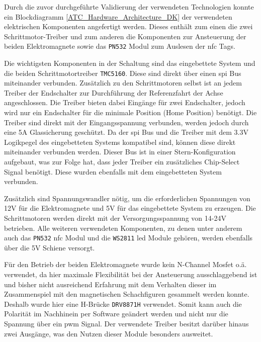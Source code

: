 Durch die zuvor durchgeführte Validierung der verwendeten Technologien
konnte ein Blockdiagramm \ref{ATC_Hardware_Architecture_DK} der
verwendeten elektrischen Komponenten angefertigt werden. Dieses enthält
zum einen die zwei Schrittmotor-Treiber und zum anderen die Komponenten
zur Ansteuerung der beiden Elektromagnete sowie das
\passthrough{\lstinline!PN532!} Modul zum Auslesen der \gls{nfc} Tags.

Die wichtigsten Komponenten in der Schaltung sind das eingebettete
System und die beiden Schrittmotortreiber
\passthrough{\lstinline!TMC5160!}. Diese sind direkt über einen
\gls{spi} Bus miteinander verbunden. Zusätzlich zu den Schrittmotoren
selbst ist an jedem Treiber der Endschalter zur Durchführung der
Referenzfahrt der Achse angeschlossen. Die Treiber bieten dabei Eingänge
für zwei Endschalter, jedoch wird nur ein Endschalter für die minimale
Position (Home Position) benötigt. Die Treiber sind direkt mit der
Eingangsspannung verbunden, werden jedoch durch eine 5A Glassicherung
geschützt. Da der \gls{spi} Bus und die Treiber mit dem 3.3V Logikpegel
des eingebetteten Systems kompatibel sind, können diese direkt
miteinander verbunden werden. Dieser Bus ist in einer
Stern-Konfiguration aufgebaut, was zur Folge hat, dass jeder Treiber ein
zusätzliches Chip-Select Signal benötigt. Diese wurden ebenfalls mit dem
eingebetteten System verbunden.

Zusätzlich sind Spannungswandler nötig, um die erforderlichen Spannungen
von 12V für die Elektromagnete und 5V für das eingebettete System zu
erzeugen. Die Schrittmotoren werden direkt mit der Versorgungsspannung
von 14-24V betrieben. Alle weiteren verwendeten Komponenten, zu denen
unter anderem auch das \passthrough{\lstinline!PN532!} \gls{nfc} Modul
und die \passthrough{\lstinline!WS2811!} \gls{led} Module gehören,
werden ebenfalls über die 5V Schiene versorgt.

Für den Betrieb der beiden Elektromagnete wurde kein N-Channel Mosfet
o.ä. verwendet, da hier maximale Flexibilität bei der Ansteuerung
ausschlaggebend ist und bisher nicht ausreichend Erfahrung mit dem
Verhalten dieser im Zusammenspiel mit den magnetischen Schachfiguren
gesammelt werden konnte. Deshalb wurde hier eine H-Brücke
\passthrough{\lstinline!DRV8871H!} verwendet. Somit kann auch die
Polarität im Nachhinein per Software geändert werden und nicht nur die
Spannung über ein \gls{pwm} Signal. Der verwendete Treiber besitzt
darüber hinaus zwei Ausgänge, was den Nutzen dieser Module besonders
ausweitet.

